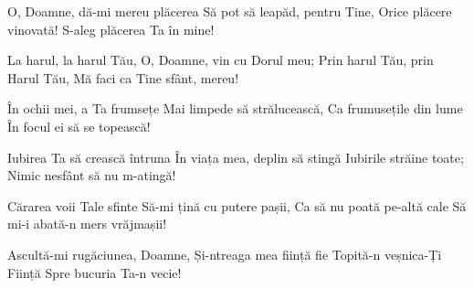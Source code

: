\beginverse
O, Doamne, dă-mi mereu plăcerea
Să pot să leapăd, pentru Tine,
Orice plăcere vinovată!
S-aleg plăcerea Ta în mine!
\endverse

\beginchorus
La harul, la harul Tău,
O, Doamne, vin cu Dorul meu;
Prin harul Tău, prin Harul Tău,
Mă faci ca Tine sfânt, mereu!
\endchorus

\beginverse
În ochii mei, a Ta frumsețe
Mai limpede să strălucească,
Ca frumusețile din lume
În focul ei să se topească!
\endverse

\beginverse
Iubirea Ta să crească întruna
În viața mea, deplin să stingă
Iubirile străine toate;
Nimic nesfânt să nu m-atingă!
\endverse

\beginverse
Cărarea voii Tale sfinte
Să-mi țină cu putere pașii,
Ca să nu poată pe-altă cale
Să mi-i abată-n mers vrăjmașii!
\endverse

\beginverse
Ascultă-mi rugăciunea, Doamne,
Și-ntreaga mea ființă fie
Topită-n veșnica-Ți Ființă
Spre bucuria Ta-n vecie!
\endverse
\endsong